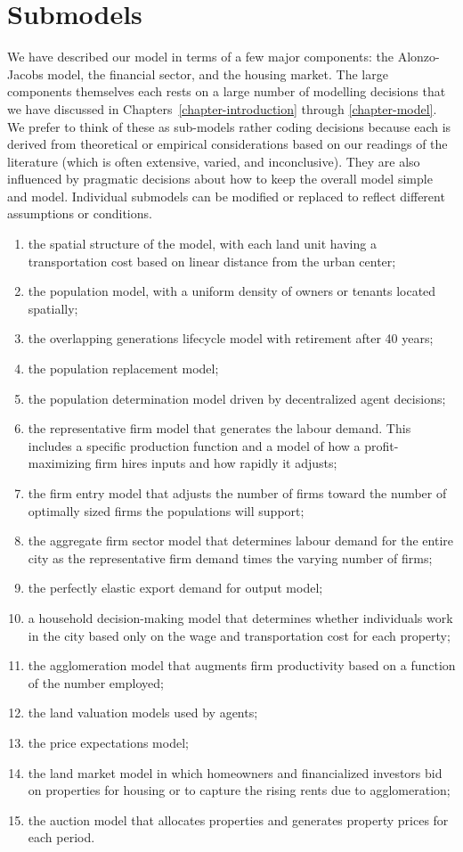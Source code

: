 \section{Submodels}
We have described our model in terms of a few major components: the Alonzo-Jacobs model, the financial sector, and the housing market.  The large components themselves each rests on a large number of modelling decisions that we have discussed in Chapters~\ref{chapter-introduction}  through \ref{chapter-model}. We prefer to think of these as sub-models rather coding decisions because each is derived from theoretical or empirical considerations based on our readings of the literature (which is often extensive, varied, and inconclusive). They are also influenced by pragmatic decisions about how to keep the overall model simple and model. Individual submodels can be modified or replaced to reflect different assumptions or conditions.
 
\begin{enumerate}
    \item the spatial structure of the model, with each land unit having a transportation cost based on linear distance from the urban center;
    \item the population model, with a uniform density of owners or tenants located spatially; 
    \item the overlapping generations lifecycle model with retirement after 40 years;
    \item the population replacement model; 
    \item the population determination model driven by decentralized agent decisions;
    \item the representative firm model that generates the labour demand. This includes a specific production function and a model of how a profit-maximizing firm hires inputs and how rapidly it adjusts;
    \item the firm entry model that adjusts the number of firms toward the number of optimally sized firms the populations will support;
    \item the aggregate firm sector model that determines labour demand for the entire city as the representative firm demand times the varying number of firms;
    \item the perfectly elastic export demand for output model; 
    \item a household decision-making model that determines whether individuals work in the city based only on the wage and transportation cost for each property; 
    \item the agglomeration model that augments firm productivity based on a function of the number employed;
    \item the land valuation models used by agents; 
    \item the price expectations model;
    \item the land market model in which homeowners and financialized investors bid on properties for housing or to capture the rising rents due to agglomeration;
    \item the auction model that allocates properties and generates property prices for each period.
\end{enumerate}


